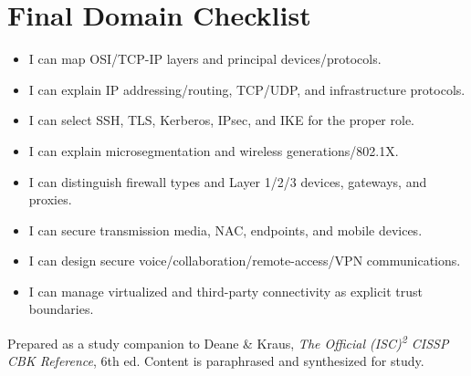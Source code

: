 \documentclass[10pt,letterpaper]{article}
\begin{document}
\section{\color{navy}Final Domain Checklist}
\begin{itemize}[label=\(\square\)]
\item I can map OSI/TCP-IP layers and principal devices/protocols.
\item I can explain IP addressing/routing, TCP/UDP, and infrastructure protocols.
\item I can select SSH, TLS, Kerberos, IPsec, and IKE for the proper role.
\item I can explain microsegmentation and wireless generations/802.1X.
\item I can distinguish firewall types and Layer 1/2/3 devices, gateways, and proxies.
\item I can secure transmission media, NAC, endpoints, and mobile devices.
\item I can design secure voice/collaboration/remote-access/VPN communications.
\item I can manage virtualized and third-party connectivity as explicit trust boundaries.
\end{itemize}
\vfill
{\footnotesize\color{teal}Prepared as a study companion to Deane \& Kraus, \textit{The Official (ISC)\textsuperscript{2} CISSP CBK Reference}, 6th ed. Content is paraphrased and synthesized for study.}
\end{document}
